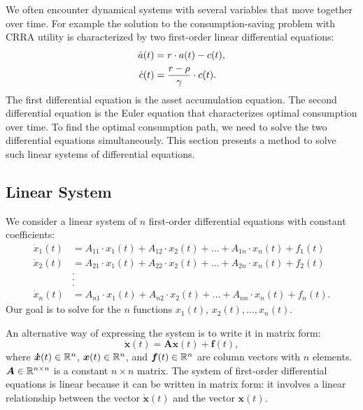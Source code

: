 \documentclass[letterpaper,12pt,leqno]{article}
\begin{document}
We often encounter dynamical systems with several variables that move together over time. For example the solution to the consumption-saving problem with CRRA utility is characterized by two first-order linear differential equations:
\begin{align*}
\dot{a}(t) &=r\cdot a(t)-c(t), \\
\dot{c}(t) &=\frac{r-\rho}{\gamma}\cdot  c(t).
\end{align*}
The first differential equation is the asset accumulation equation. The second differential equation is the Euler equation that characterizes optimal consumption over time. To find the optimal consumption path, we need to solve the two differential equations simultaneously. This section presents a method to solve such linear systems of differential equations.

\subsection{Linear System}

We consider a linear system of $n$ first-order differential equations with constant coefficients:
\begin{align*}
\dot{x}_{1}(t) &=A_{11}\cdot x_{1}(t)+A_{12}\cdot x_{2}(t)+\ldots+A_{1n}\cdot x_{n}(t) +f_{1}(t) \\
\dot{x}_{2}(t) &=A_{21}\cdot x_{1}(t)+A_{22}\cdot x_{2}(t)+\ldots+A_{2n}\cdot x_{n}(t) +f_{2}(t) \\
&. \\
&. \\
&. \\
\dot{x}_{n}(t) &=A_{n1}\cdot x_{1}(t)+A_{n2}\cdot x_{2}(t)+\ldots+A_{nn}\cdot x_{n}(t) +f_{n}(t).
\end{align*}
Our goal is to solve for the $n$ functions $x_{1}(t)$, $x_{2}(t),\ldots, x_{n}(t)$.

An alternative way of expressing the system is to write it in matrix form:
\begin{equation}
\bm{\dot{x}}(t) =\bm{A}  \bm{x}(t) +\bm{f}(t), \label{eq:FODEsys}
\end{equation}
where $\bm{\dot{x}}(t) \in \mathbb{R}^{n}$, $\bm{x}(t) \in \mathbb{R}^{n}$, and $\bm{f}(t) \in \mathbb{R}^{n}$ are column vectors with $n$ elements. $\bm{A}\in \mathbb{R}^{n\times n}$ is a constant $n\times n$ matrix. The system of first-order differential equations is linear because it can be written in matrix form: it involves a linear relationship between the vector $\bm{\dot{x}}(t)$ and the vector $\bm{x}(t)$.
\end{document}
